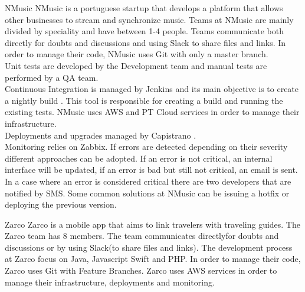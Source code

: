     \begin{companyreport}{NMusic}
      \product
      NMusic is a portuguese startup that develops a platform that allows other businesses to stream and synchronize music.
      \teams
      Teams at NMusic are mainly divided by speciality and have between 1-4 people. Teams communicate  both directly for doubts and discussions and using Slack to share files and links.
      \development
      In order to manage their code, NMusic uses Git with only a master branch.  \\
      Unit tests are developed by the Development team and manual tests are performed by a QA team. \\
      Continuous Integration is managed by Jenkins and its main objective is to create a nightly build . This tool is  responsible for creating a build and running the existing tests.
      \operations
      NMusic uses AWS and PT Cloud services in order to manage their infrastructure.\\
      Deployments and upgrades managed by Capistrano .\\
      Monitoring relies on Zabbix. If errors are detected depending on their severity different approaches can be adopted. If an error is not critical, an internal interface will be updated, if an error is bad but still not critical, an email is sent. In a case where an error is considered critical there are two developers that are notified by SMS. Some common solutions at NMusic can be issuing a hotfix or deploying the previous version.
      \reportend
    \end{companyreport}

    \begin{companyreport}{Zarco}
      \product
      Zarco is a mobile app that aims to link travelers with traveling guides.
      \teams
      The Zarco team has 8 members. The team communicates directly{for doubts and discussions} or by using Slack(to share files and links).
      \development
      The development process at Zarco focus on Java, Javascript Swift  and PHP. In order to manage their code, Zarco uses Git with Feature Branches.
      \operations
      Zarco uses AWS services in order to manage their infrastructure, deployments and monitoring.
      \reportend
    \end{companyreport}

